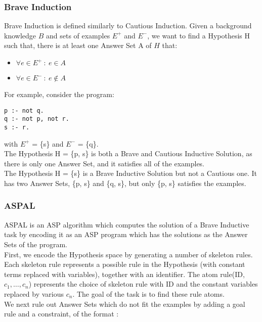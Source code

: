 \subsubsection{Brave Induction}

Brave Induction is defined similarly to Cautious Induction. Given a background knowledge $B$ and sets of examples $E^+$ and $E^-$, we want to find a Hypothesis H such that, there is at least one Answer Set A of $H$ that:

\begin{itemize}
\item $\forall e \in E^+ \: : \: e \in A$
\item $\forall e \in E^- \: : \: e \not \in A$
\end{itemize}

For example, consider the program:

\begin{lstlisting}
p :- not q.
q :- not p, not r.
s :- r.
\end{lstlisting}

with $E^+$ = \{s\} and $E^-$ = \{q\}. \\
The Hypothesis H = \{p, s\} is both a Brave and Cautious Inductive Solution, as there is only one Answer Set, and it satisfies all of the examples.\\

The Hypothesis H = \{s\} is a Brave Inductive Solution but not a Cautious one. It has two Answer Sets, \{p, s\} and \{q, s\}, but only \{p, s\} satisfies the examples.

\subsubsection{ASPAL}

ASPAL is an ASP algorithm which computes the solution of a Brave Inductive task by encoding it as an ASP program which has the solutions as the Answer Sets of the program.\\

First, we encode the Hypothesis space by generating a number of skeleton rules. Each skeleton rule represents a possible rule in the Hypothesis (with constant terms replaced with variables), together with an identifier. The atom rule(ID, $c_1, \dots, c_n$) represents the choice of skeleton rule with ID and the constant variables replaced by various $c_n$. The goal of the task is to find these rule atoms.\\

We next rule out Answer Sets which do not fit the examples by adding a goal rule and a constraint, of the format :

